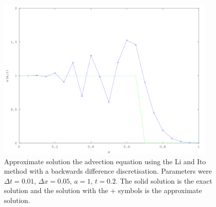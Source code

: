 \begin{figure}[h]
    \centering
    \includegraphics[width=0.95\textwidth]{diagrams/LiItoHeaviside}
    \caption{Approximate solution the advection equation using the Li and Ito method with a backwards difference discretisation.
    Parameters were $\Delta t = 0.01$, $\Delta x = 0.05$, $a = 1$, $t = 0.2$.
    The solid solution is the exact solution and the solution with the + symbols is the approximate solution.}
    \label{LiItoHeaviside}
\end{figure}
